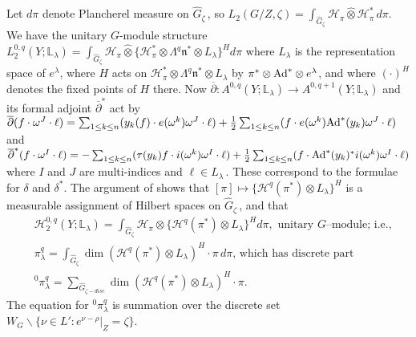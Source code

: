 \documentclass{conm-p-l}
\def\gn{\mathfrak{n}}
\def\Ad{{\rm Ad}}
\def\L{\mathbb{L}}
\def\cH{\mathcal{H}}
\begin{document}
Let $d\pi$ denote Plancherel measure on $\widehat{G}_\zeta$\,, so
$L_2(G/Z,\zeta) = \int_{\widehat{G}_\zeta} \cH_\pi \widehat{\otimes}
\cH_\pi^*\, d\pi$.  We have the unitary $G$-module structure 
$L_2^{0,q}(Y;\L_\lambda) =
\int_{\widehat{G}_\zeta} \cH_\pi \widehat{\otimes}\{\cH_\pi^* \otimes
\Lambda^q \gn^* \otimes L_\lambda\}^H d\pi$
where $L_\lambda$ is the representation space of $e^\lambda$, where
$H$ acts on $\cH_\pi^* \otimes \Lambda^q \gn^* \otimes L_\lambda$ by
$\pi^* \otimes \Ad^* \otimes e^\lambda$, and where $(\cdot )^H$
denotes the fixed points of $H$ there.  Now
$\overline{\partial}: A^{0,q}(Y;\L_\lambda) \to A^{0,q+1}(Y;\L_\lambda)$
and its formal adjoint $\overline{\partial}^*$ act by \hfill\newline
\phantom{XX}$\overline{\partial}(f\cdot\omega^J
	\cdot \ell) = \sum_{1\leq k\leq n} (y_k(f)\cdot e(\omega^k)\omega^J
	\cdot \ell) + \frac{1}{2} \sum_{1\leq k\leq n} (f\cdot e(\omega^k)
	\Ad^*(y_k)\omega^J\cdot\ell)$\hfill\newline
and \hfill\newline
\phantom{XX} $ \overline{\partial}^*(f\cdot\omega^I
	\cdot \ell) = -\sum_{1\leq k\leq n}(\tau(y_k)f\cdot i(\omega^k)\omega^I
	\cdot\ell) + \frac{1}{2} \sum_{1\leq k\leq n} (f\cdot \Ad^*(y_k)^*
	i(\omega^k)\omega^I\cdot\ell)$ \hfill\newline
where $I$ and $J$ are multi-indices and $\ell \in L_\lambda$\,.
These correspond to the formulae for $\delta$ and $\delta^*$.  The
argument of \cite[Lemmas 5 and 6]{S1971} shows that
$[\pi] \mapsto \{\cH^q(\pi^*) \otimes L_\lambda\}^H$ 
is a measurable assignment of Hilbert spaces on $\widehat{G}_\zeta$\,, 
and that 
\begin{equation}\label{7.6.5}
\begin{aligned}
&\cH_2^{0,q}(Y;\L_\lambda) =
	\int_{\widehat{G}_\zeta} \cH_\pi \otimes \{\cH^q(\pi^*)
	\otimes L_\lambda\}^H d\pi, \text{ unitary $G$--module; i.e.,}\\
&\pi_\lambda^q = \int_{\widehat{G}_\zeta}
	\dim (\cH^q(\pi^*)\otimes L_\lambda)^H\cdot\pi\,d\pi
	\text{, which has discrete part}\\
&^0\pi_\lambda^q = {\sum}_{\widehat{G}_{\zeta-disc}}
	\dim (\cH^q(\pi^*)\otimes L_\lambda)^H\cdot\pi.
\end{aligned}
\end{equation}
The equation for $^0\pi_\lambda^q$ is summation over the 
discrete set $W_G\backslash \{\nu \in L' : e^{\nu - \rho}|_Z = \zeta\}$.
\end{document}
